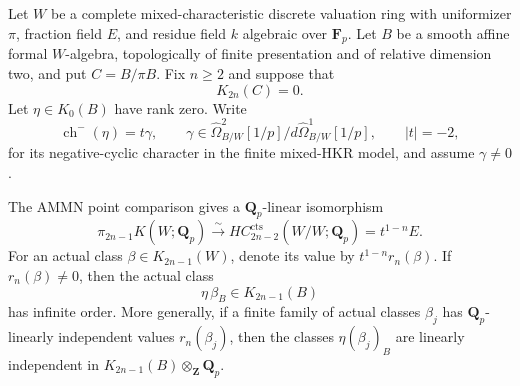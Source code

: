 \begin{lemma}
\label{d3:lem:formalhigherTCcup}
Let $W$ be a complete mixed-characteristic discrete valuation ring
with uniformizer $\pi$, fraction field $E$, and residue field $k$
algebraic over $\mathbf F_p$. Let $B$ be a smooth affine formal
$W$-algebra, topologically of finite presentation and of relative
dimension two, and put $C=B/\pi B$.
Fix $n\geq2$ and suppose that
\[
 K_{2n}(C)=0.
\]
Let $\eta\in K_0(B)$ have rank zero. Write
\[
 \operatorname{ch}^-(\eta)=t\gamma,
 \qquad
 \gamma\in\widehat\Omega^2_{B/W}[1/p]
               /d\widehat\Omega^1_{B/W}[1/p],
 \qquad |t|=-2,
\]
for its negative-cyclic character in the finite mixed-HKR model,
and assume $\gamma\ne0$.

The AMMN point comparison gives a $\mathbf Q_p$-linear isomorphism
\[
 \pi_{2n-1}K(W;\mathbf Q_p)
       \xrightarrow{\ \sim\ }
 HC_{2n-2}^{\mathrm{cts}}(W/W;\mathbf Q_p)
       =t^{1-n}E.
\]
For an actual class $\beta\in K_{2n-1}(W)$, denote its value by
$t^{1-n}r_n(\beta)$. If $r_n(\beta)\ne0$, then the actual class
\[
                  \eta\,\beta_B\in K_{2n-1}(B)
\]
has infinite order. More generally, if a finite family of actual
classes $\beta_j$ has $\mathbf Q_p$-linearly independent values
$r_n(\beta_j)$, then the classes $\eta(\beta_j)_B$ are linearly
independent in $K_{2n-1}(B)\otimes_{\mathbf Z}\mathbf Q_p$.
\end{lemma}

